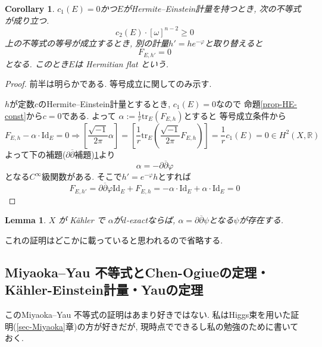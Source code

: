 \documentclass[dvipdfmx,a4paper,11pt]{article} %
\newtheorem{cor}[thm]{Corollary}
\newtheorem{lem}[thm]{Lemma}
\theoremstyle{definition}
\theoremstyle{remark}
\numberwithin{equation}{section}
\newcommand{\R}{\mathbb{R}}
\begin{document}
\begin{cor}
$c_1(E)=0$かつ$E$がHermite--Einstein計量を持つとき, 次の不等式が成り立つ. 
$$
c_2(E) \cdot [\omega]^{n-2}
\ge 0
$$
上の不等式の等号が成立するとき, 別の計量$h'=h e^{-\varphi}$と取り替えると
$$
F_{E,h'} = 0
$$
となる. このとき$E$は Hermitian flat という.
\end{cor}
\begin{proof}
前半は明らかである. 
等号成立に関してのみ示す. 

$h$が定数$c$のHermite--Einstein計量とするとき, $c_1(E)=0$なので
命題\ref{prop-HE-const}から$c=0$である.
よって
$\alpha := \frac{1}{r} \mathrm{tr}_{E}(F_{E,h})$とすると
等号成立条件から
\[
 F_{E,h} -\alpha \cdot \mathrm{Id}_{E}=0
 \Rightarrow 
[ \frac{\sqrt{-1}}{2\pi}\alpha]
=[\frac{1}{r}\mathrm{tr}_E(\frac{\sqrt{-1}}{2\pi} F_{E,h} )]
=\frac{1}{r}c_1(E)=0 \in H^2(X, \R)
\]
よって下の補題($\partial\overline{\partial}$補題)\ref{lem-ddc-lem}より
$$
\alpha = -\partial \overline{\partial} \varphi
$$
となる$C^\infty$級関数がある. 
そこで$h' =e^{-\varphi}h$とすれば
$$
F_{E,h'}
= \partial \overline{\partial} \varphi \mathrm{Id}_{E} + F_{E,h}
= - \alpha \cdot \mathrm{Id}_{E}+
\alpha \cdot \mathrm{Id}_{E}=0
$$
\end{proof}


\begin{lem}
\label{lem-ddc-lem}
$X$ が Kähler で 
$\alpha$が$d$-exactならば, $\alpha= \partial \overline{\partial} \psi$となる$\psi$が存在する. 
\end{lem}
これの証明はどこかに載っていると思われるので省略する. 


\subsection{Miyaoka--Yau 不等式とChen-Ogiueの定理・Kähler-Einstein計量・Yauの定理}
このMiyaoka--Yau 不等式の証明はあまり好きではない. 
私はHiggs束を用いた証明(\ref{sec-Miyaoka}章)の方が好きだが, 現時点でできるし私の勉強のために書いておく. 
\end{document}
